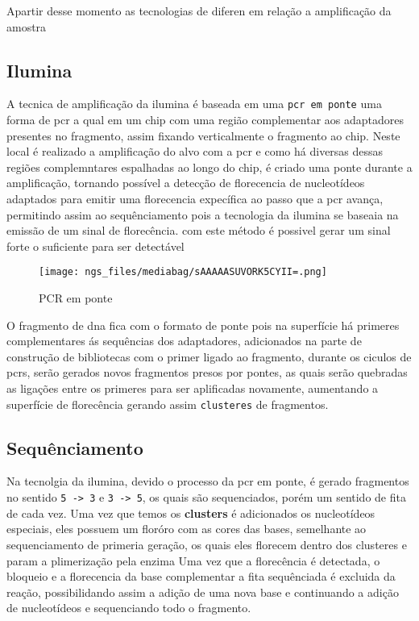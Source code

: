 \documentclass[
  letterpaper,
  DIV=11,
  numbers=noendperiod]{scrartcl}
\begin{document}
Apartir desse momento as tecnologias de diferen em relação a
amplificação da amostra

\subsection{Ilumina}\label{ilumina}

A tecnica de amplificação da ilumina é baseada em uma
\texttt{pcr\ em\ ponte} uma forma de pcr a qual em um chip com uma
região complementar aos adaptadores presentes no fragmento, assim
fixando verticalmente o fragmento ao chip. Neste local é realizado a
amplificação do alvo com a pcr e como há diversas dessas regiões
complemntares espalhadas ao longo do chip, é criado uma ponte durante a
amplificação, tornando possível a detecção de florecencia de
nucleotídeos adaptados para emitir uma florecencia expecífica ao passo
que a pcr avança, permitindo assim ao sequênciamento pois a tecnologia
da ilumina se baseaia na emissão de um sinal de florecência. com este
método é possivel gerar um sinal forte o suficiente para ser detectável

\begin{figure}[H]

{\centering \texttt{[image: ngs\_files/mediabag/sAAAAASUVORK5CYII=.png]}

}

\caption{PCR em ponte}

\end{figure}%

O fragmento de dna fica com o formato de ponte pois na superfície há
primeres complementares ás sequências dos adaptadores, adicionados na
parte de construção de bibliotecas com o primer ligado ao fragmento,
durante os ciculos de pcrs, serão gerados novos fragmentos presos por
pontes, as quais serão quebradas as ligações entre os primeres para ser
aplificadas novamente, aumentando a superfície de florecência gerando
assim \texttt{clusteres} de fragmentos.

\subsection{Sequênciamento}\label{sequuxeanciamento-1}

Na tecnolgia da ilumina, devido o processo da pcr em ponte, é gerado
fragmentos no sentido
\texttt{5\textquotesingle{}\ -\textgreater{}\ 3\textquotesingle{}} e
\texttt{3\textquotesingle{}\ -\textgreater{}\ 5\textquotesingle{}}, os
quais são sequenciados, porém um sentido de fita de cada vez. Uma vez
que temos os \textbf{clusters} é adicionados os nucleotídeos especiais,
eles possuem um floróro com as cores das bases, semelhante ao
sequenciamento de primeria geração, os quais eles florecem dentro dos
clusteres e param a plimerização pela enzima Uma vez que a florecência é
detectada, o bloqueio e a florecencia da base complementar a fita
sequênciada é excluida da reação, possibilidando assim a adição de uma
nova base e continuando a adição de nucleotídeos e sequenciando todo o
fragmento.
\end{document}
